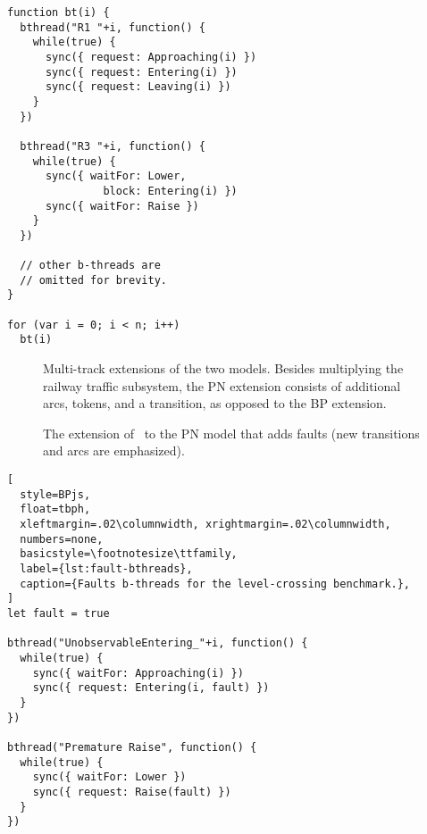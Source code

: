 \documentclass[10pt,journal,compsoc]{IEEEtran}
\theoremstyle{definition}
\begin{document}
\newsavebox{\tempbox}
\newbox{\mybox}
\begin{lrbox}{\mybox}
\begin{lstlisting}[linewidth=7cm,numbers=none]
function bt(i) {
  bthread("R1 "+i, function() {
    while(true) {
      sync({ request: Approaching(i) })
      sync({ request: Entering(i) })
      sync({ request: Leaving(i) })
    }
  })

  bthread("R3 "+i, function() {
    while(true) {
      sync({ waitFor: Lower, 
               block: Entering(i) })
      sync({ waitFor: Raise })
    }
  })

  // other b-threads are 
  // omitted for brevity. 
}

for (var i = 0; i < n; i++) 
  bt(i)
\end{lstlisting}
\end{lrbox}

\begin{figure*}[tbph]
    \centering
    \qquad\qquad\qquad
    \caption{Multi-track extensions of the two models. Besides multiplying the railway traffic subsystem, the PN extension consists of additional arcs, tokens, and a transition, as opposed to the BP extension.}
    \label{fig:multi-track}
\end{figure*}

\begin{figure}
  \centering
{}
  \caption{The extension of~\cite{ghazel2016customizable} to the PN model that adds faults (new transitions and arcs are emphasized).}
  \label{fig:ghazel-fault} 
\end{figure}


\begin{lstlisting}[
  style=BPjs,
  float=tbph,
  xleftmargin=.02\columnwidth, xrightmargin=.02\columnwidth,
  numbers=none,
  basicstyle=\footnotesize\ttfamily,
  label={lst:fault-bthreads},
  caption={Faults b-threads for the level-crossing benchmark.},
]
let fault = true

bthread("UnobservableEntering_"+i, function() {
  while(true) {
    sync({ waitFor: Approaching(i) })
    sync({ request: Entering(i, fault) })
  }
})

bthread("Premature Raise", function() {
  while(true) {
    sync({ waitFor: Lower })
    sync({ request: Raise(fault) })
  }
})
\end{lstlisting}
\end{document}
